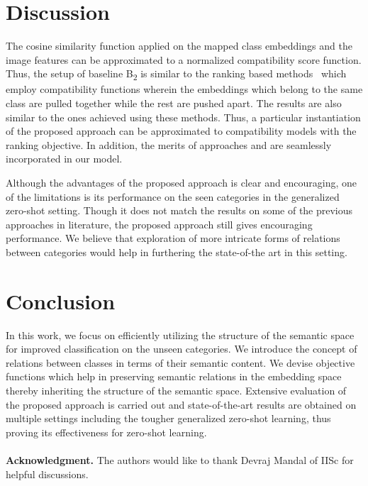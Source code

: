 \documentclass[10pt,twocolumn,letterpaper]{article}
\begin{document}
\section{Discussion}
\label{discuss}
The cosine similarity function applied on the mapped class embeddings and the image features can be approximated to a normalized compatibility score function.  Thus, the setup of baseline B\textsubscript{2} is similar to the ranking based methods~\cite{akata2013label,xian2016latent,frome2013devise} which employ compatibility functions wherein the embeddings which belong to the same class are pulled together while the rest are pushed apart. 
The results are also similar to the ones achieved using these methods. Thus, a particular instantiation of the proposed approach can be approximated to compatibility models with the ranking objective.
In addition, the merits of approaches \cite{Kodirov_2017_CVPR} and \cite{zhang2016learning} are seamlessly incorporated in our model.

Although the advantages of the proposed approach is clear and encouraging, one of the limitations is its performance on the seen categories in the generalized zero-shot setting. Though it does not match the results on some of the previous approaches in literature, the proposed approach still gives encouraging performance. We believe that exploration of more intricate forms of relations between categories would help in furthering the state-of-the art in this setting.

\section{Conclusion}
\label{conclude}
In this work, we focus on efficiently utilizing the structure of the semantic space for improved classification on the unseen categories. 
We introduce the concept of relations between classes in terms of their semantic content. 
We devise objective functions which help in preserving semantic relations in the embedding space thereby inheriting the structure of the semantic space.
Extensive evaluation of the proposed approach is carried out and state-of-the-art results are obtained on multiple settings including the tougher generalized zero-shot learning, thus proving its effectiveness for zero-shot learning.\\\\
\textbf{Acknowledgment.} The authors would like to thank Devraj Mandal of IISc for helpful discussions.
{\small
	
	
}
\end{document}
